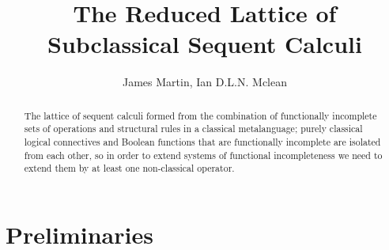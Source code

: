 \documentclass{article}
\author{James Martin, Ian D.L.N. Mclean}
\title{The Reduced Lattice of Subclassical Sequent Calculi}
\begin{document}
\maketitle

\begin{abstract}
The lattice of sequent calculi formed from the combination of functionally incomplete sets of operations and structural rules in a classical metalanguage; purely classical logical connectives and Boolean functions that are functionally incomplete are isolated from each other, so in order to extend systems of functional incompleteness we need to extend them by at least one non-classical operator.
\end{abstract}

\part{Preliminaries}
\end{document}
